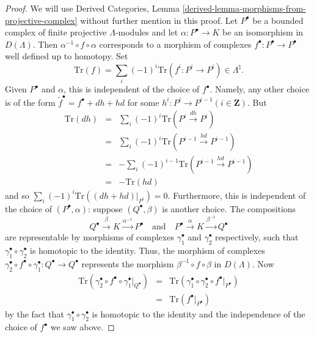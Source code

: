 \begin{proof}
We will use Derived Categories, Lemma
\ref{derived-lemma-morphisms-from-projective-complex}
without further mention in this proof.
Let $P^\bullet$ be a bounded complex of finite projective $\Lambda$-modules
and let $\alpha : P^\bullet \to K$ be an isomorphism in $D(\Lambda)$. Then
$\alpha^{-1}\circ f\circ \alpha$ corresponds to a morphism of complexes
$f^\bullet : P^\bullet \to P^\bullet$ well defined up to homotopy.
Set
$$
\text{Tr}(f) = \sum_i (-1)^i \text{Tr}(f^i : P^i \to P^i) \in \Lambda^\natural.
$$
Given $P^\bullet$ and $\alpha$, this is independent of the choice of
$f^\bullet$. Namely, any other choice is of the form
$\tilde{f}^\bullet = f^\bullet + dh +hd$ for some
$h^i : P^i \to P^{i-1}(i\in \mathbf{Z})$. But
\begin{eqnarray*}
\text{Tr}(dh) & = & \sum_i (-1)^i \text{Tr}(P^i\xrightarrow{dh} P^i) \\
& = & \sum_i (-1)^i \text{Tr}(P^{i-1}\xrightarrow{hd} P^{i-1}) \\
& = & -\sum_i (-1)^{i-1}\text{Tr}(P^{i-1}\xrightarrow{hd} P^{i-1}) \\
& = & - \text{Tr}(hd)
\end{eqnarray*}
and so $\sum_i (-1)^i \text{Tr} ((dh+hd)|_{P^i})=0$.
Furthermore, this is independent of the choice of $(P^\bullet , \alpha)$:
suppose $(Q^\bullet, \beta)$ is another choice. The compositions
$$
Q^\bullet \xrightarrow{\beta} K \xrightarrow{\alpha^{-1}} P^\bullet
\quad\text{and}\quad
P^\bullet \xrightarrow{\alpha} K \xrightarrow{\beta^{-1}} Q^\bullet
$$
are representable by morphisms of complexes $\gamma_1^\bullet$ and
$\gamma_2^\bullet$ respectively, such that $\gamma_1^\bullet \circ
\gamma_2^\bullet$ is homotopic to the identity. Thus, the morphism of complexes
$\gamma_2^\bullet\circ f^\bullet\circ \gamma_1^\bullet : Q^\bullet\to Q^\bullet$
represents the morphism $\beta^{-1}\circ f\circ\beta$ in $D(\Lambda)$. Now
\begin{eqnarray*}
\text{Tr}(\gamma_2^\bullet\circ f^\bullet\circ\gamma_1^\bullet|_{Q^\bullet}) &
= & \text{Tr}(\gamma_1^\bullet \circ\gamma_2^\bullet \circ
f^\bullet|_{P^\bullet})\\
& = & \text{Tr}(f^\bullet|_{P^\bullet})
\end{eqnarray*}
by the fact that $\gamma_1^\bullet \circ \gamma_2^\bullet$ is homotopic to the
identity and the independence of the choice of $f^\bullet$ we saw above.
\end{proof}

